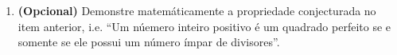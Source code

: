 \begin{enumerate}
\begin{enumerate}
        \item {\bf (Opcional)} Demonstre matemáticamente a propriedade conjecturada no item anterior, i.e.  ``Um núemero inteiro positivo é um quadrado perfeito se e somente se ele possui um número ímpar de divisores''.
    \end{enumerate}
\end{enumerate}

